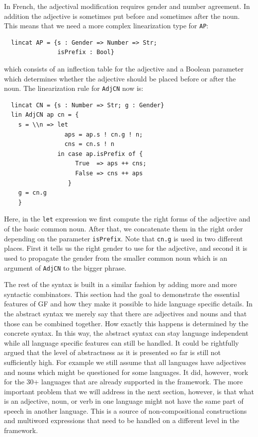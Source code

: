 \documentclass[output=paper]{LSP/langsci}
\begin{document}
In French, the adjectival modification requires gender and number agreement. 
In addition the adjective is sometimes put before and sometimes after the noun. 
This means that we need a more complex linearization type for \verb=AP=:
\begin{verbatim}
  lincat AP = {s : Gender => Number => Str;
               isPrefix : Bool}
\end{verbatim}
which consists of an inflection table for the adjective and a Boolean parameter which determines whether the adjective should be placed before or after the noun. The linearization rule for \verb=AdjCN= now is:
\begin{verbatim}
  lincat CN = {s : Number => Str; g : Gender}
  lin AdjCN ap cn = {
    s = \\n => let 
                 aps = ap.s ! cn.g ! n; 
                 cns = cn.s ! n
               in case ap.isPrefix of {
                    True  => aps ++ cns;
                    False => cns ++ aps
                  }
    g = cn.g
    }
\end{verbatim}
Here, in the \verb=let= expression we first compute the right forms of 
the adjective and of the basic common noun. After that, 
we concatenate them in the right order depending on 
the parameter \verb=isPrefix=. Note that \verb=cn.g= 
is used in two different places. First it tells us the right gender 
to use for the adjective, and second it is used to propagate 
the gender from the smaller common noun which is an 
argument of \verb=AdjCN= to the bigger phrase. 

The rest of the syntax is built in a similar fashion by adding more 
and more syntactic combinators. This section had the goal to demonstrate
the essential features of GF and how they make it possible to 
hide language specific details. In the abstract syntax we merely 
say that there are adjectives and nouns and that those 
can be combined together. How exactly this happens is determined by 
the concrete syntax. In this way, the abstract syntax 
can stay language independent while all language specific features 
can still be handled. It could be rightfully argued that 
the level of abstractness as it is presented so far is still not 
sufficiently high. For example we still assume that all languages 
have adjectives and nouns which might be questioned for some languages. 
It did, however, work for the 30+ languages that are already supported 
in the framework. 
The more important problem that we will address in the next section, 
however, is that what is an adjective, noun, or verb in 
one language might not have the same part of speech in another language.
This is a source of non-compositional constructions and 
multiword expressions that need to be handled on a different level 
in the framework.
\end{document}
